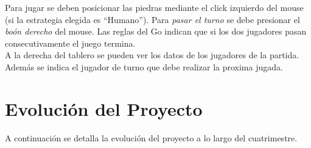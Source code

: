 \documentclass[11pt]{article}
\begin{document}
Para jugar se deben posicionar las piedras mediante el click izquierdo del mouse (si la estrategia elegida es ``Humano''). Para\textit{ pasar el turno}
se debe presionar el\textit{ bo\'on derecho} del mouse. Las reglas del Go indican que si los dos jugadores pasan consecutivamente el juego termina.\\
A la derecha del tablero se pueden ver los datos de los jugadores de la partida. Adem\'as se indica el jugador de turno que debe realizar la proxima jugada.

\newpage
\section{Evoluci\'on del Proyecto}

A continuaci\'on se detalla la evoluci\'on del proyecto a lo largo del cuatrimestre.
\end{document}
